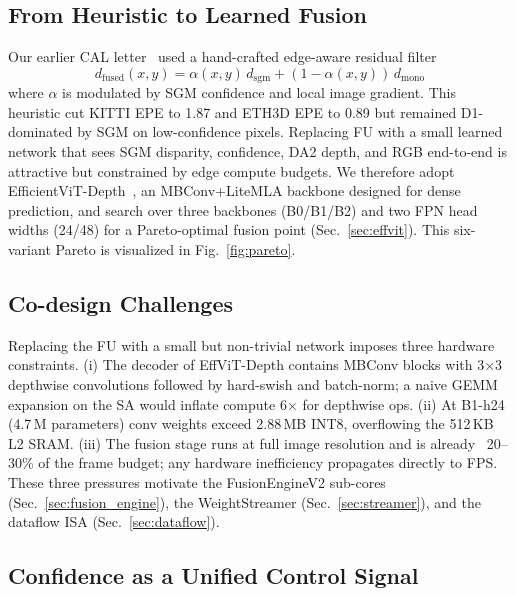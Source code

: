 \documentclass[journal]{IEEEtran}
\begin{document}
\subsection{From Heuristic to Learned Fusion}
\label{sec:bg_learned}
Our earlier CAL letter~\cite{ours2024cal} used a hand-crafted edge-aware residual filter
\begin{equation}
\label{eq:heuristic}
d_{\text{fused}}(x,y) = \alpha(x,y)\,d_{\text{sgm}} + (1-\alpha(x,y))\,d_{\text{mono}}
\end{equation}
where $\alpha$ is modulated by SGM confidence and local image gradient. This heuristic cut KITTI EPE to 1.87 and ETH3D EPE to 0.89 but remained D1-dominated by SGM on low-confidence pixels. Replacing FU with a small learned network that sees SGM disparity, confidence, DA2 depth, and RGB end-to-end is attractive but constrained by edge compute budgets. We therefore adopt EfficientViT-Depth~\cite{cai2023efficientvit}, an MBConv+LiteMLA backbone designed for dense prediction, and search over three backbones (B0/B1/B2) and two FPN head widths (24/48) for a Pareto-optimal fusion point (Sec.~\ref{sec:effvit}). This six-variant Pareto is visualized in Fig.~\ref{fig:pareto}.

\subsection{Co-design Challenges}
Replacing the FU with a small but non-trivial network imposes three hardware constraints. (i) The decoder of EffViT-Depth contains MBConv blocks with 3$\times$3 depthwise convolutions followed by hard-swish and batch-norm; a naive GEMM expansion on the SA would inflate compute 6$\times$ for depthwise ops. (ii) At B1-h24 (4.7\,M parameters) conv weights exceed 2.88\,MB INT8, overflowing the 512\,KB L2 SRAM. (iii) The fusion stage runs at full image resolution and is already ~20--30\% of the frame budget; any hardware inefficiency propagates directly to FPS. These three pressures motivate the FusionEngineV2 sub-cores (Sec.~\ref{sec:fusion_engine}), the WeightStreamer (Sec.~\ref{sec:streamer}), and the dataflow ISA (Sec.~\ref{sec:dataflow}).

\subsection{Confidence as a Unified Control Signal}
\label{sec:controlsignal}
\end{document}
